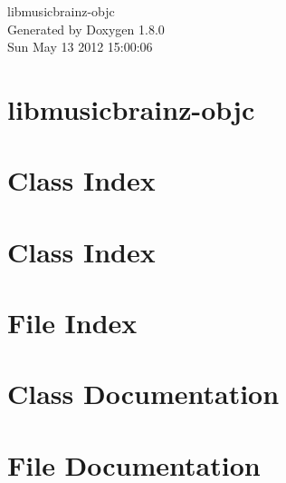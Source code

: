 \documentclass{book}
\begin{document}
\hypersetup{pageanchor=false,citecolor=blue}
\begin{titlepage}
\vspace*{7cm}
\begin{center}
{\Large libmusicbrainz-\/objc }\\
\vspace*{1cm}
{\large Generated by Doxygen 1.8.0}\\
\vspace*{0.5cm}
{\small Sun May 13 2012 15:00:06}\\
\end{center}
\end{titlepage}
\clearemptydoublepage
{}
\tableofcontents
\clearemptydoublepage
{}
\hypersetup{pageanchor=true,citecolor=blue}
\chapter{libmusicbrainz-\/objc}
\label{index}\hypertarget{index}{}
\chapter{Class Index}

\chapter{Class Index}

\chapter{File Index}

\chapter{Class Documentation}










\chapter{File Documentation}




















\printindex
\end{document}
